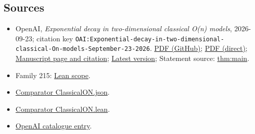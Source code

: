 \documentclass[11pt]{article}
\begin{document}
\subsection{Sources}
\begin{itemize}
\item OpenAI, \emph{Exponential decay in two-dimensional classical O(n) models}, 2026-09-23; citation key \texttt{OAI:Exponential-decay-in-two-dimensional-classical-On-models-September-23-2026}. \href{https://github.com/openai/math/blob/adc7f1241b42e322a6451854ab7e4b4c146bf78a/preprints/Exponential-decay-in-two-dimensional-classical-On-models-September-23-2026/paper.pdf}{PDF (GitHub)}; \href{https://github.com/openai/math/raw/adc7f1241b42e322a6451854ab7e4b4c146bf78a/preprints/Exponential-decay-in-two-dimensional-classical-On-models-September-23-2026/paper.pdf}{PDF (direct)}; \href{https://github.com/openai/math/blob/adc7f1241b42e322a6451854ab7e4b4c146bf78a/preprints/Exponential-decay-in-two-dimensional-classical-On-models-September-23-2026/README.md}{Manuscript page and citation}; \href{https://github.com/openai/math/blob/main/preprints/Exponential-decay-in-two-dimensional-classical-On-models-September-23-2026/paper.pdf}{Latest version}; Statement source: \href{https://github.com/openai/math/blob/adc7f1241b42e322a6451854ab7e4b4c146bf78a/preprints/Exponential-decay-in-two-dimensional-classical-On-models-September-23-2026/build/main.tex\#L76}{thm:main}.
\item Family 215: \href{https://github.com/openai/math/blob/adc7f1241b42e322a6451854ab7e4b4c146bf78a/lean/docs/215.md}{Lean scope}.
\item \href{https://github.com/openai/math/blob/adc7f1241b42e322a6451854ab7e4b4c146bf78a/lean/ComparatorChallenges/ClassicalON.json}{Comparator ClassicalON.json}.
\item \href{https://github.com/openai/math/blob/adc7f1241b42e322a6451854ab7e4b4c146bf78a/lean/ComparatorChallenges/ClassicalON.lean}{Comparator ClassicalON.lean}.
\item \href{https://github.com/openai/math/blob/adc7f1241b42e322a6451854ab7e4b4c146bf78a/CONTENTS.md}{OpenAI catalogue entry}.
\end{itemize}
\end{document}
